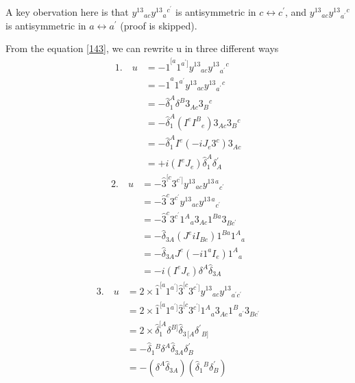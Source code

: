 \documentclass[12pt]{article}
\begin{document}
A key obervation here is that $y^{13}{}_{ac}y^{13}{}_{a}{}^{c^\prime}$ is antisymmetric in $c\leftrightarrow c^\prime$, and $y^{13}{}_{ac}y^{13}{}_{a^\prime}{}^{c}$ is antisymmetric in $a \leftrightarrow a^\prime$ (proof is skipped).

From the equation \eqref{143}, we can rewrite u in three different ways
\begin{equation}
    \begin{aligned}
        1.\quad u&=-\hat{1}^{[a}1^{a^\prime]}y^{13}{}_{ac}y^{13}{}_{a^\prime}{}^{c}\\
            &=-\hat{1}^a1^{a^\prime}y^{13}{}_{ac}y^{13}{}_{a^\prime}{}^{c}\\
            &=-\hat{\delta}_1^A\delta^B 3_{Ac}3_B{}^c\\
            &=-\hat{\delta}_1^A (I^e I^B{}_e)3_{Ac}3_B{}^c\\
            &=-\hat{\delta}_1^A I^e (-iJ_e 3^c)3_{Ac}\\
            &=+i(I^eJ_e)\hat{\delta}_1^A\delta^\prime_A
    \end{aligned}
\end{equation}
\begin{equation}
    \begin{aligned}
        2.\quad u&=-\hat{3}^{[c}3^{c^\prime]}y^{13}{}_{ac}y^{13\,a}{}_{c^\prime}\\
            &=-\hat{3}^c3^{c^\prime}y^{13}{}_{ac}y^{13\,a}{}_{c^\prime}\\
            &=-\hat{3}^c3^{c^\prime}1^A{}_a3_{Ac}1^{Ba}3_{Bc^\prime}\\
            &=-\hat{\delta}_{3A}(J^eiI_{Be})1^{Ba}1^A{}_a\\
            &=-\hat{\delta}_{3A}J^e(-i1^aI_e)1^A{}_a\\
            &=-i(I^eJ_e)\delta^A\hat{\delta}_{3A}
    \end{aligned}
\end{equation}
\begin{equation}
    \begin{aligned}
        3. \quad u&=2\times \hat{1}^{[a}1^{a^\prime]}\hat{3}^{[c}3^{c^\prime]}y^{13}{}_{ac}y^{13}{}_{a^{\prime} c^{\prime}}\\
            &=2\times\hat{1}^{[a}1^{a^\prime]}\hat{3}^{[c}3^{c^\prime]}1^A{}_a3_{Ac}1^B{}_{a^\prime}3_{Bc^\prime}\\
            &=2\times \hat{\delta}_1^{[A}\delta^{B]}\hat{\delta}_{3\,[A}\delta^\prime{}_{B]}\\
            &=-\hat{\delta}_1{}^B\delta^A\hat{\delta}_{3A}\delta^\prime_B\\
            &=-(\delta^A\hat{\delta}_{3A})(\hat{\delta}_1{}^B\delta^\prime_B)
    \end{aligned}
\end{equation}
\end{document}
